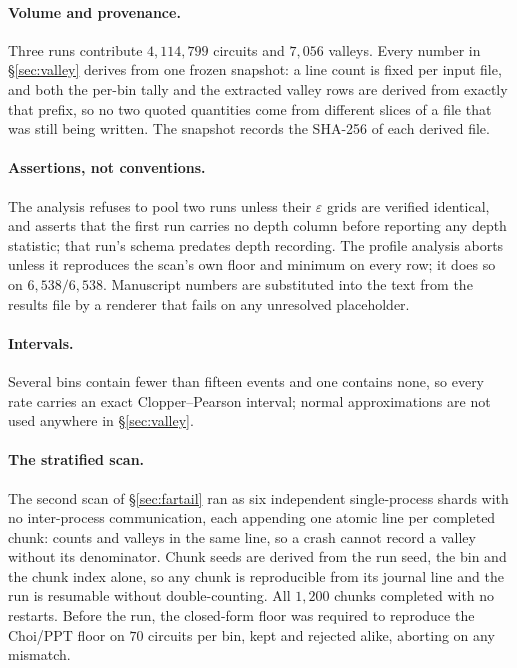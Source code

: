 \documentclass[11pt,a4paper]{article}
\theoremstyle{definition}
\theoremstyle{remark}
\begin{document}
\paragraph{Volume and provenance.} Three runs contribute $4{,}114{,}799$ circuits and $7{,}056$ valleys. Every number in \S\ref{sec:valley} derives from one frozen snapshot: a line count is fixed per input file, and both the per-bin tally and the extracted valley rows are derived from exactly that prefix, so no two quoted quantities come from different slices of a file that was still being written. The snapshot records the SHA-256 of each derived file.

\paragraph{Assertions, not conventions.} The analysis refuses to pool two runs unless their $\varepsilon$ grids are verified identical, and asserts that the first run carries no depth column before reporting any depth statistic; that run's schema predates depth recording. The profile analysis aborts unless it reproduces the scan's own floor and minimum on every row; it does so on $6{,}538/6{,}538$. Manuscript numbers are substituted into the text from the results file by a renderer that fails on any unresolved placeholder.

\paragraph{Intervals.} Several bins contain fewer than fifteen events and one contains none, so every rate carries an exact Clopper--Pearson interval; normal approximations are not used anywhere in \S\ref{sec:valley}.

\paragraph{The stratified scan.} The second scan of \S\ref{sec:fartail} ran as six independent single-process shards with no inter-process communication, each appending one atomic line per completed chunk: counts and valleys in the same line, so a crash cannot record a valley without its denominator. Chunk seeds are derived from the run seed, the bin and the chunk index alone, so any chunk is reproducible from its journal line and the run is resumable without double-counting. All $1{,}200$ chunks completed with no restarts. Before the run, the closed-form floor was required to reproduce the Choi/PPT floor on $70$ circuits per bin, kept and rejected alike, aborting on any mismatch.
\end{document}
